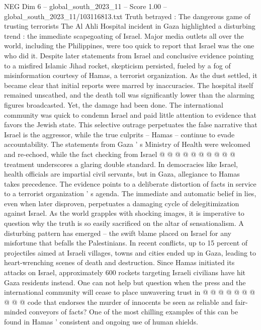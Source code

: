\begin{textsample}{NEG Dim 6 – global\_south\_2023\_11 – Score 1.00 – global\_south\_2023\_11/103116813.txt}  \label{ex:f6_neg_192}
Truth betrayed : The dangerous game of trusting terrorists The Al Ahli Hospital incident in Gaza highlighted a disturbing trend : the immediate scapegoating of Israel.
Major media outlets all over the world, including the Philippines, were too quick to report that Israel was the one who did it.
Despite later statements from Israel and conclusive evidence pointing to a misfired Islamic Jihad rocket, skepticism persisted, fueled by a fog of misinformation courtesy of Hamas, a terrorist organization.
As the dust settled, it became clear that initial reports were marred by inaccuracies.
The hospital itself remained unscathed, and the death toll was significantly lower than the alarming figures broadcasted.
Yet, the damage had been done.
The international community was quick to condemn Israel and paid little attention to evidence that favors the Jewish state.
This selective outrage perpetuates the false narrative that Israel is the aggressor, while the true culprits -- Hamas -- continue to evade accountability.
The statements from Gaza ' s Ministry of Health were welcomed and re-echoed, while the fact checking from Israel @ @ @ @ @ @ @ @ @ @ treatment underscores a glaring double standard.
In democracies like Israel, health officials are impartial civil servants, but in Gaza, allegiance to Hamas takes precedence.
The evidence points to a deliberate distortion of facts in service to a terrorist organization ' s agenda.
The immediate and automatic belief in lies, even when later disproven, perpetuates a damaging cycle of delegitimization against Israel.
As the world grapples with shocking images, it is imperative to question why the truth is so easily sacrificed on the altar of sensationalism.
A disturbing pattern has emerged -- the swift blame placed on Israel for any misfortune that befalls the Palestinians.
In recent conflicts, up to 15 percent of projectiles aimed at Israeli villages, towns and cities ended up in Gaza, leading to heart-wrenching scenes of death and destruction.
Since Hamas initiated its attacks on Israel, approximately 600 rockets targeting Israeli civilians have hit Gaza residents instead.
One can not help but question when the press and the international community will cease to place unwavering trust in @ @ @ @ @ @ @ @ @ @ code that endorses the murder of innocents be seen as reliable and fair-minded conveyors of facts?
One of the most chilling examples of this can be found in Hamas ' consistent and ongoing use of human shields.

\end{textsample}
